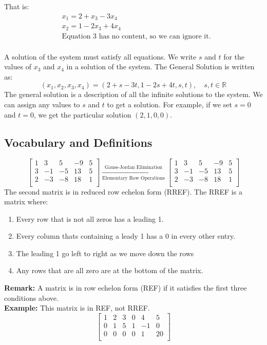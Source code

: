 \documentclass[12pt]{article}
\theoremstyle{definition}
\theoremstyle{plain}
\begin{document}
\noindent That is:
$$
\begin{aligned}
  &x_1 = 2 + x_3 - 3x_4 \\ 
  &x_2 = 1 - 2x_3 + 4x_4 \\
  &\text{Equation 3 has no content, so we can ignore it.} \\
\end{aligned}
$$

\noindent A solution of the system must satisfy all equations. We write $s$ and $t$ for the values of $x_3$ and $x_4$ in a solution of the system. The General Solution is written as:
\[(x_1, x_2, x_3, x_4) = (2 + s - 3t, 1 - 2s + 4t, s, t), \quad s, t \in \mathbb{R}\]
The general solution is a description of all the infinite solutions to the system. We can assign any values to $s$ and $t$ to get a solution. For example, if we set $s=0$ and $t=0$, we get the particular solution $(2,1,0,0)$.

\subsection{Vocabulary and Definitions}
\[
  \left[\!
  \begin{array}{rrrr|r}
  1 & 3 & 5 & -9 & 5\\
  3 & -1 & -5 & 13 & 5\\
  2 & -3 & -8 & 18 & 1\\
  \end{array}
  \!\right]
  \xrightarrow[\text{Elementary Row Operations}]{\text{Gauss-Jordan Elimination}}
  \left[\!
  \begin{array}{rrrr|r}
    1 & 3 & 5 & -9 & 5\\
    3 & -1 & -5 & 13 & 5\\
    2 & -3 & -8 & 18 & 1\\
  \end{array}
  \!\right]
\]
The second matrix is in reduced row echelon form (RREF). The RREF is a matrix where:
\begin{enumerate}
  \item Every row that is not all zeros has a leading 1.
  \item Every column thats containing a leady 1 has a 0 in every other entry.
  \item The leading 1 go left to right as we move down the rows
  \item Any rows that are all zero are at the bottom of the matrix.
\end{enumerate}
\textbf{Remark:}  A matrix is in row echelon form (REF) if it satisfies the first three conditions above. \\
\textbf{Example:} This matrix is in REF, not RREF.
\[
  \left[\!
  \begin{array}{rrrrr|r}
  1 & 2 & 3 & 0 & 4 & 5\\
  0 & 1 & 5 & 1 & -1 & 0\\
  0 & 0 & 0 & 0 & 1 & 20\\
  \end{array}
  \!\right]
\]
\newpage
\end{document}
